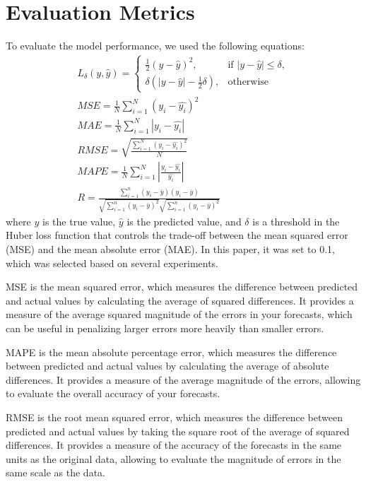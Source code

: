 \section{Evaluation Metrics}
\label{eval_appendix}
To evaluate the model performance, we used the following equations:
\begin{subequations}
\begin{gather}
    L_\delta (y, \hat{y}) = 
    \begin{cases}
    \frac{1}{2} (y - \hat{y})^2, & \text{if } |y - \hat{y}| \leq \delta,\\
    \delta (|y - \hat{y}| - \frac{1}{2} \delta), & \text{otherwise}
    \label{eq_huber}
    \end{cases}
    \\
    MSE = \frac{1}{N} \sum_{i=1}^{N} (y_i - \hat{y_i})^2\\ 
    MAE = \frac{1}{N} \sum_{i=1}^{N} |y_i - \hat{y_i}|\\ 
    RMSE = \sqrt{\frac{\sum_{i=1}^{N}(y_i - \hat{y_i})^2}{N}}\\ 
    MAPE = \frac{1}{N} \sum_{i=1}^{N} |\frac{y_i - \hat{y_i}}{\hat{y_i}}|\\ 
    R = \frac{\sum_{i=1}^n (y_i - \bar{y}) (y_i - \bar{y})}{\sqrt{\sum_{i=1}^n (y_i - \bar{y})^2} \sqrt{\sum_{i=1}^n (y_i - \bar{y})^2}}
\end{gather}
\label{eq_metrics}
\end{subequations}
where $y$ is the true value, $\hat{y}$ is the predicted value, and $\delta$ is a threshold in the Huber loss function that controls the trade-off between the mean squared error (MSE) and the mean absolute error (MAE). In this paper, it was set to 0.1, which was selected based on several experiments.

MSE is the mean squared error, which measures the difference between predicted and actual values by calculating the average of squared differences. It provides a measure of the average squared magnitude of the errors in your forecasts, which can be useful in penalizing larger errors more heavily than smaller errors. 

MAPE is the mean absolute percentage error, which measures the difference between predicted and actual values by calculating the average of absolute differences. It provides a measure of the average magnitude of the errors, allowing to evaluate the overall accuracy of your forecasts. 

RMSE is the root mean squared error, which measures the difference between predicted and actual values by taking the square root of the average of squared differences. It provides a measure of the accuracy of the forecasts in the same units as the original data, allowing to evaluate the magnitude of errors in the same scale as the data. 

